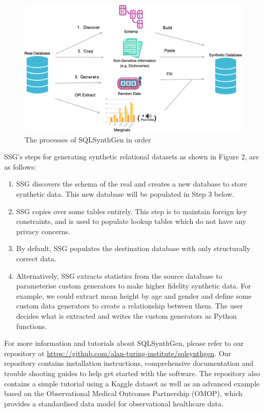 \documentclass[11pt]{article}
\begin{document}
\begin{figure}[ht]
\centering
\includegraphics[width=0.8\linewidth]{figures/SSG.png}
\caption{The processes of SQLSynthGen in order}
\label{fig:Range of fidelity for synthetic data}
\end{figure}

SSG's steps for generating synthetic relational datasets as shown in Figure 2, are as follows:

\begin{enumerate}
    \item SSG discovers the schema of the real and creates a new database to store synthetic data. This new database will be populated in Step 3 below. 
    \item SSG copies over some tables entirely. This step is to maintain foreign key constraints, and is used to populate lookup tables which do not have any privacy concerns.
    \item By default, SSG populates the destination database with only structurally correct data. \item Alternatively, SSG extracts statistics from the source database to parameterise custom generators to make higher fidelity synthetic data. For example, we could extract mean height by age and gender and define some custom data generators to create a relationship between them. The user decides what is extracted and writes the custom generators as Python functions.
\end{enumerate}

For more information and tutorials about SQLSynthGen, please refer to our repository at \url{https://github.com/alan-turing-institute/sqlsynthgen}. Our repository \cite{repository} contains installation instructions, comprehensive documentation and trouble shooting guides to help get started with the software. The repository also contains a simple tutorial using a Kaggle dataset \cite{airbnb} as well as an advanced example based on the Observational Medical Outcomes Partnership (OMOP)\cite{omop}, which provides a standardised data model for observational healthcare data. 
\end{document}
